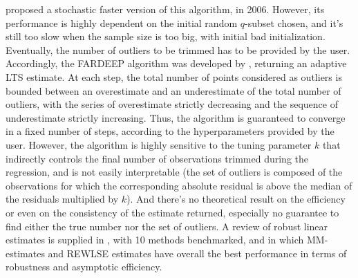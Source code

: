 \autocite{rousseeuw_vandriessen06} proposed a stochastic faster version of this algorithm,
in 2006. However, its performance is highly dependent on the initial
random \(q\)-subset chosen, and it's still too slow when the sample size
is too big, with initial bad initialization. Eventually, the number of
outliers to be trimmed has to be provided by the user. Accordingly, the
FARDEEP algorithm was developed by
\autocite{hao_etal19}, returning an
adaptive LTS estimate. At each step, the total number of points
considered as outliers is bounded between an overestimate and an
underestimate of the total number of outliers, with the series of
overestimate strictly decreasing and the sequence of underestimate
strictly increasing. Thus, the algorithm is guaranteed to converge in a
fixed number of steps, according to the hyperparameters provided by the
user. However, the algorithm is highly sensitive to the tuning parameter
\(k\) that indirectly controls the final number of observations trimmed
during the regression, and is not easily interpretable (the set of
outliers is composed of the observations for which the corresponding
absolute residual is above the median of the residuals multiplied by
\(k\)). And there's no theoretical result on the efficiency or even on
the consistency of the estimate returned, especially no guarantee to
find either the true number nor the set of outliers. A review of robust
linear estimates is supplied in \autocite{yu_etal14}, with 10 methods benchmarked, and in which
MM-estimates and REWLSE estimates have overall the best performance in
terms of robustness and asymptotic efficiency.

